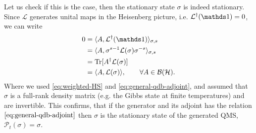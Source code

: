 Let us check if this is the case, then the stationary state $\sigma$ is indeed stationary. Since $\mathcal{L}$ generates unital maps in the Heisenberg picture, i.e. $\mathcal{L}^\dagger(\idm) = 0$, we can write 
\begin{equation}
    \label{eq:sigma-is-fix}
    \begin{split}
        0 &= \langle A, \mathcal{L}^\dagger(\idm) \rangle_{\sigma, s} \\
        &= \langle A, \sigma^{s-1} \mathcal{L}(\sigma) \sigma^{-s} \rangle_{\sigma, s} \\
        &= \tr[A^\dagger \mathcal{L}(\sigma)] \\
        &= \langle A, \mathcal{L}(\sigma)\rangle, \qquad\forall A\in\mathcal{B(H)}.
    \end{split}
\end{equation}
Where we used \eqref{eq:weighted-HS} and \eqref{eq:general-qdb-adjoint}, and assumed that $\sigma$ is a full-rank density matrix (e.g. the Gibbs state at finite temperatures) and are invertible. 
This confirms, that if the generator and its adjoint has the relation $\eqref{eq:general-qdb-adjoint}$ then $\sigma$ is the stationary state of the generated QMS, $\mathcal{P}_t(\sigma) = \sigma$.

